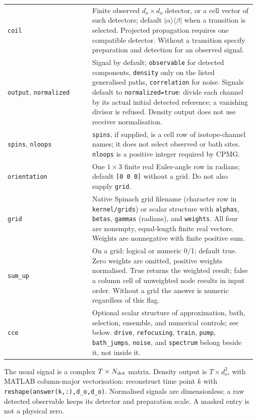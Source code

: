 \documentclass[11pt,a4paper]{article}
\newcommand{\code}[1]{\texttt{#1}}
\begin{document}
\begin{longtable}{@{}>{\raggedright\arraybackslash}p{0.335\linewidth}@{\hspace{0.025\linewidth}}>{\raggedright\arraybackslash}p{0.64\linewidth}@{}}
\code{coil} & Finite observed $d_o\times d_o$ detector, or a cell vector of such detectors; default $\lvert\alpha\rangle\langle\beta\rvert$ when a transition is selected. Projected propagation requires one compatible detector. Without a transition specify preparation and detection for an observed signal.\\
\code{output}, \code{normalized} & Signal by default; \code{observable} for detected components, \code{density} only on the listed generalised paths, \code{correlation} for noise. Signals default to \code{normalized=true}: divide each channel by its actual initial detected reference; a vanishing divisor is refused. Density output does not use receiver normalisation.\\
\code{spins}, \code{nloops} & \code{spins}, if supplied, is a cell row of isotope-channel names; it does not select observed or bath sites. \code{nloops} is a positive integer required by CPMG.\\
\code{orientation} & One $1\times3$ finite real Euler-angle row in radians; default \code{[0 0 0]} without a grid. Do not also supply \code{grid}.\\
\code{grid} & Native Spinach grid filename (character row in \code{kernel/grids}) or scalar structure with \code{alphas}, \code{betas}, \code{gammas} (radians), and \code{weights}. All four are nonempty, equal-length finite real vectors. Weights are nonnegative with finite positive sum.\\
\code{sum\_up} & On a grid: logical or numeric 0/1; default true. Zero weights are omitted, positive weights normalised. True returns the weighted result; false a column cell of unweighted node results in input order. Without a grid the answer is numeric regardless of this flag.\\
\code{cce} & Optional scalar structure of approximation, bath, selection, ensemble, and numerical controls; see below. \code{drive}, \code{refocusing}, \code{train}, \code{pump}, \code{bath\_jumps}, \code{noise}, and \code{spectrum} belong beside it, not inside it.\\
\end{longtable}
\endgroup
The usual signal is a complex $T\times N_{\rm det}$ matrix. Density output is $T\times d_o^2$, with MATLAB column-major vectorisation: reconstruct time point $k$ with \code{reshape(answer(k,:),d\_o,d\_o)}. Normalised signals are dimensionless; a raw detected observable keeps its detector and preparation scale. A masked entry is not a physical zero.
\end{document}

